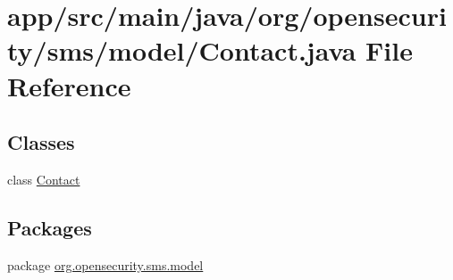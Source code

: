 \hypertarget{a00017}{\section{app/src/main/java/org/opensecurity/sms/model/\+Contact.java File Reference}
\label{a00017}
}
\subsection*{Classes}
\begin{DoxyCompactItemize}
\item 
class \hyperlink{a00005}{Contact}
\end{DoxyCompactItemize}
\subsection*{Packages}
\begin{DoxyCompactItemize}
\item 
package \hyperlink{a00036}{org.\+opensecurity.\+sms.\+model}
\end{DoxyCompactItemize}
